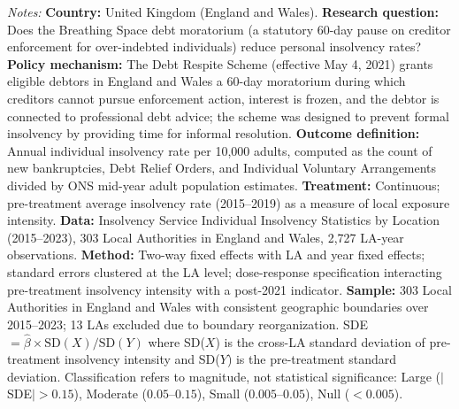 \begin{table}[htbp]
{\footnotesize \textit{Notes:} \textbf{Country:} United Kingdom (England and Wales). \textbf{Research question:} Does the Breathing Space debt moratorium (a statutory 60-day pause on creditor enforcement for over-indebted individuals) reduce personal insolvency rates? \textbf{Policy mechanism:} The Debt Respite Scheme (effective May 4, 2021) grants eligible debtors in England and Wales a 60-day moratorium during which creditors cannot pursue enforcement action, interest is frozen, and the debtor is connected to professional debt advice; the scheme was designed to prevent formal insolvency by providing time for informal resolution. \textbf{Outcome definition:} Annual individual insolvency rate per 10,000 adults, computed as the count of new bankruptcies, Debt Relief Orders, and Individual Voluntary Arrangements divided by ONS mid-year adult population estimates. \textbf{Treatment:} Continuous; pre-treatment average insolvency rate (2015--2019) as a measure of local exposure intensity. \textbf{Data:} Insolvency Service Individual Insolvency Statistics by Location (2015--2023), 303 Local Authorities in England and Wales, 2,727 LA-year observations. \textbf{Method:} Two-way fixed effects with LA and year fixed effects; standard errors clustered at the LA level; dose-response specification interacting pre-treatment insolvency intensity with a post-2021 indicator. \textbf{Sample:} 303 Local Authorities in England and Wales with consistent geographic boundaries over 2015--2023; 13 LAs excluded due to boundary reorganization. SDE $= \hat{\beta} \times \text{SD}(X) / \text{SD}(Y)$ where SD($X$) is the cross-LA standard deviation of pre-treatment insolvency intensity and SD($Y$) is the pre-treatment standard deviation. Classification refers to magnitude, not statistical significance: Large ($|$SDE$| > 0.15$), Moderate ($0.05$--$0.15$), Small ($0.005$--$0.05$), Null ($< 0.005$).}
\end{table}

